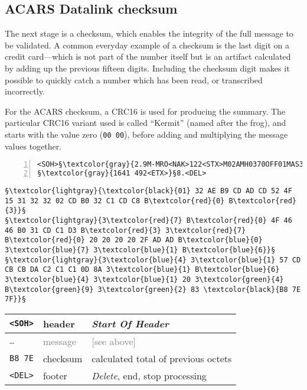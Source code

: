 \documentclass[tikz,a4paper,12pt]{article}
\begin{document}
\subsection{ACARS Datalink checksum}

The next stage is a checksum, which enables the integrity of the full
message to be validated.  A common everyday example of a checksum is
the last digit on a credit card---which is not part of the number
itself but is an artifact calculated by adding up the previous fifteen
digits.  Including the checksum digit makes it possible to quickly
catch a number which has been read, or transcribed incorrectly.

For the \gls{ACARS} checksum, a \gls{CRC16} is used for producing the summary.  The particular \gls{CRC16} variant used is called ``Kermit''
(named after the frog), and starts with the value zero (\texttt{00~00}), before adding and multiplying the message values together.

\begin{lstlisting}[language=ACARS,numbers=left,linewidth=\textwidth]
<SOH>§\textcolor{gray}{2.9M-MRO<NAK>122<STX>M02AMH0370OFF01MAS370}§    §\textcolor{gray}{/-{}-071641WMKKZBAA\textbackslash r\textbackslash n}§
§\textcolor{gray}{1641 492<ETX>}§8.<DEL>
\end{lstlisting}

\begin{lstlisting}[language=ACARS]
      §\textcolor{lightgray}{\textcolor{black}{01} 32 AE B9 CD AD CD 52 4F 15 31 32 32 02 CD B0 32 C1 CD C8 B\textcolor{red}{0} B\textcolor{red}{3}}§
§\textcolor{lightgray}{3\textcolor{red}{7} B\textcolor{red}{0} 4F 46 46 B0 31 CD C1 D3 B\textcolor{red}{3} 3\textcolor{red}{7} B\textcolor{red}{0} 20 20 20 20 2F AD AD B\textcolor{blue}{0} 3\textcolor{blue}{7} 3\textcolor{blue}{1} B\textcolor{blue}{6}}§
§\textcolor{lightgray}{3\textcolor{blue}{4} 3\textcolor{blue}{1} 57 CD CB CB DA C2 C1 C1 0D 8A 3\textcolor{blue}{1} B\textcolor{blue}{6} 3\textcolor{blue}{4} 3\textcolor{blue}{1} 20 3\textcolor{green}{4} B\textcolor{green}{9} 3\textcolor{green}{2} 83 \textcolor{black}{B8 7E 7F}}§
\end{lstlisting}

\begin{center}
\begin{tabular}{p{1.5cm}p{2cm}p{8cm}}
\hfill\texttt{<SOH>}&header&\emph{Start Of Header}\\
\hline
\hfill\textcolor{gray}{\texttt{\ldots}}&\textcolor{gray}{message}&\textcolor{gray}{[see above]}\\
\hline
\hfill\texttt{B8 7E}&checksum&calculated total of previous octets\\
\hfill\texttt{<DEL>}&footer&\emph{Delete}, end, stop processing
\end{tabular}
\end{center}
\end{document}
